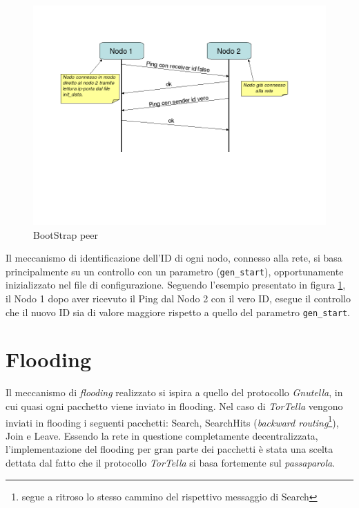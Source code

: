 \begin{figure}[H]
\begin{center}
\includegraphics[scale=0.5]{etc/Bootstrap.png}
\caption{BootStrap peer}
\label{bootstrap}
\end{center}
\end{figure}
Il meccanismo di identificazione dell'ID di ogni nodo, connesso alla rete, si basa principalmente su un controllo con un parametro (\texttt{gen\_start}), opportunamente inizializzato nel file di configurazione. Seguendo l'esempio presentato in figura \ref{bootstrap}, il Nodo 1 dopo aver ricevuto il Ping dal Nodo 2 con il vero ID, esegue il controllo che il nuovo ID sia di valore maggiore rispetto a quello del parametro \texttt{gen\_start}.
\section{Flooding}
Il meccanismo di \textit{flooding} realizzato si ispira a quello del protocollo \textit{Gnutella}, in cui quasi ogni pacchetto viene inviato in flooding. Nel caso di \textit{TorTella} vengono inviati in flooding i seguenti pacchetti: Search, SearchHits (\textit{backward routing}\footnote{segue a ritroso lo stesso cammino del rispettivo messaggio di Search}), Join e Leave. Essendo la rete in questione completamente decentralizzata, l'implementazione del flooding per gran parte dei pacchetti è stata una scelta dettata dal fatto che il protocollo \textit{TorTella} si basa fortemente sul \textit{passaparola}.
